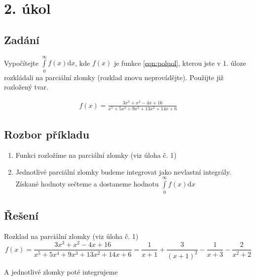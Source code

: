 \section{2. úkol}
\subsection*{Zadání}
 Vypočítejte  $\int\limits_0^\infty f(x) \mathrm{d}x$, kde $f(x)$ je funkce \ref{eqn:polpol}, kterou jste v 1. úloze rozkládali na parciální zlomky (rozklad znovu neprovádějte). Použijte již rozložený tvar.

 \begin{eqnarray}
f(x)=\frac{3x^3+x^2-4x+16}{x^5+5x^4+9x^3+13x^2+14x+6}
\label{eqn:polpol}
\end{eqnarray}

\subsection*{Rozbor příkladu}
\begin{enumerate}
\item Funkci rozložíme na parciální zlomky (viz úloha č. 1)
\item Jednotlivé parciální zlomky budeme integrovat jako nevlastní integrály.
\iten Získané hodnoty sečteme a dostaneme hodnotu $\int\limits_0^\infty f(x) \mathrm{d}x$
\end{enumerate}

\subsection*{Řešení}
\noindent Rozklad na parciální zlomky (viz úloha č. 1)
\begin{displaymath}
f(x)=
\frac{3x^3+x^2-4x+16}{x^5+5x^4+9x^3+13x^2+14x+6} 
= 
\frac{1}{x+1} +
\frac{3}{(x+1)^2} -
\frac{1}{x+3} -
\frac{2}{x^2+2}
\end{displaymath}

\noindent A jednotlivé zlomky poté integrujeme

